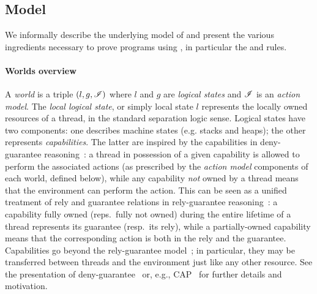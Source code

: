\section{\colosl}

\subsection{\colosl Model}\label{sec:model}

We informally describe the underlying model of \colosl and present the
various ingredients necessary to prove programs using \colosl, in
particular the \extendRule and \shiftRule rules.

\paragraph{Worlds overview}
A \emph{world} is a triple $(l, g, \mathscr{I})$ where $l$ and $g$ are
\emph{logical states} and $\mathscr{I}$ is an \emph{action model}. The
\emph{local logical state}, or simply local state $l$ represents the
locally owned resources of a thread, in the standard separation logic
sense. Logical states have two components: one describes machine
states (e.g. stacks and heaps); the other represents
\emph{capabilities}. The latter are inspired by the capabilities in
deny-guarantee reasoning~\cite{dg}: a thread in possession of a given
capability is allowed to perform the associated actions (as prescribed
by the \emph{action model} components of each world, defined below),
while any capability \emph{not} owned by a thread means that the
environment can perform the action. This can be seen as a unified
treatment of rely and guarantee relations in rely-guarantee
reasoning~\cite{rg}: a capability fully owned (reps.\ fully not owned)
during the entire lifetime of a thread represents its guarantee
(resp.\ its rely), while a partially-owned capability means that the
corresponding action is both in the rely and the
guarantee. Capabilities go beyond the rely-guarantee model~\cite{dg};
in particular, they may be transferred between threads and the
environment just like any other resource. See the presentation of
deny-guarantee~\cite{dg} or, e.g., CAP~\cite{cap} for further
details and motivation.

